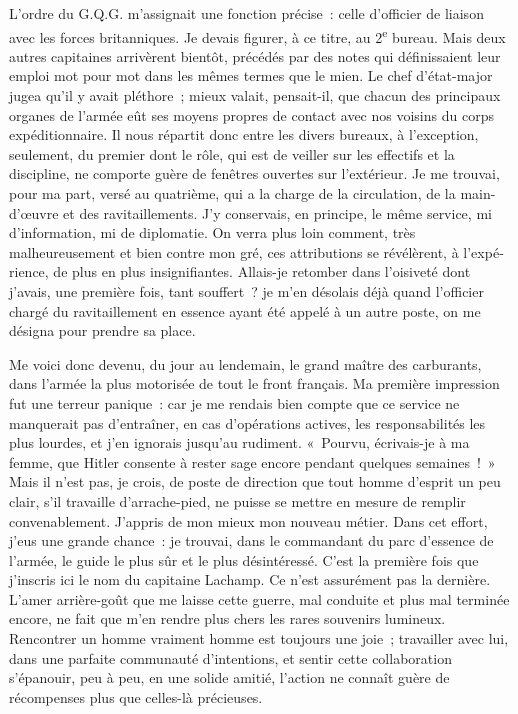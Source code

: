 \documentclass[french,twoside]{book} %
\begin{document}
L’ordre du G.Q.G. m’assignait une fonction précise : celle d’officier de liaison avec les forces britanniques. Je devais figurer, à ce titre, au 2\textsuperscript{e} bureau. Mais deux autres capitaines arrivèrent bientôt, pré­cédés par des notes qui définissaient leur emploi mot pour mot dans les mêmes termes que le mien. Le chef d’état-major jugea qu’il y avait   pléthore ; mieux valait, pensait-il, que chacun des principaux organes de l’armée eût ses moyens propres de contact avec nos voisins du corps expéditionnaire. Il nous répartit donc entre les divers bureaux, à l’exception, seulement, du premier dont le rôle, qui est de veiller sur les effectifs et la discipline, ne comporte guère de fenêtres ouvertes sur l’extérieur. Je me trouvai, pour ma part, versé au quatrième, qui a la charge de la circulation, de la main-d’œuvre et des ravitaille­ments. J’y conservais, en principe, le même service, mi d’information, mi de diplomatie. On verra plus loin comment, très malheureusement et bien contre mon gré, ces attributions se révélèrent, à l’expé­rience, de plus en plus insignifiantes. Allais-je retom­ber dans l’oisiveté dont j’avais, une première fois, tant souffert ? je m’en désolais déjà quand l’officier chargé du ravitaillement en essence ayant été appelé à un autre poste, on me désigna pour prendre sa place.\par
Me voici donc devenu, du jour au lendemain, le grand maître des carburants, dans l’armée la plus motorisée de tout le front français. Ma première impression fut une terreur panique : car je me rendais bien compte que ce service ne manquerait pas d’entraîner, en cas d’opérations actives, les responsabilités les plus lourdes, et j’en ignorais jusqu’au rudiment. « Pourvu, écrivais-je à ma femme, que Hitler consente à rester sage encore pendant quelques semaines ! » Mais il n’est pas, je crois, de poste de direction que tout homme d’esprit un peu clair, s’il travaille d’arrache-pied, ne puisse se mettre en mesure de remplir convenablement. J’appris de mon mieux mon nouveau métier. Dans cet effort, j’eus une grande chance : je trouvai, dans le commandant du parc d’essence de l’armée, le guide le plus sûr et le plus désintéressé. C’est la première fois que j’inscris ici le nom du capitaine Lachamp. Ce n’est assurément pas la dernière. L’amer   arrière-goût que me laisse cette guerre, mal conduite et plus mal terminée encore, ne fait que m’en rendre plus chers les rares souvenirs lumineux. Rencontrer un homme vraiment homme est toujours une joie ; travailler avec lui, dans une parfaite communauté d’intentions, et sentir cette collaboration s’épanouir, peu à peu, en une solide amitié, l’action ne connaît guère de récompenses plus que celles-là précieuses.\par
\end{document}
